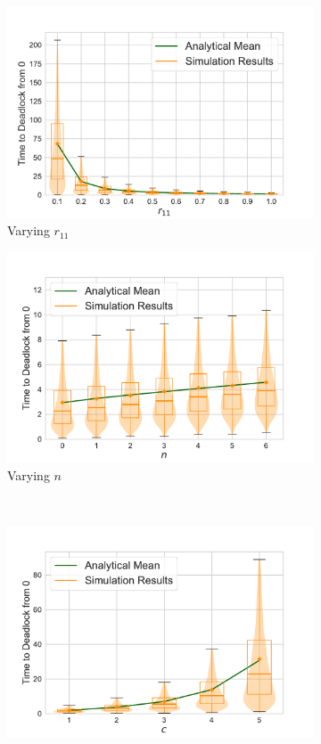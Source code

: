 \documentclass{article}
\numberwithin{equation}{section}
\begin{document}
\begin{figure}[!htbp]
\begin{center}
\begin{subfigure}[b]{0.48\textwidth}
    \includegraphics[width=\textwidth]{images/1Nms_varyr11}
    \caption{Varying $r_{11}$}
    \label{fig:1Nms_r11}
  \end{subfigure}
  \begin{subfigure}[b]{0.48\textwidth}
    \includegraphics[width=\textwidth]{images/1Nms_varyn}
    \caption{Varying $n$}
    \label{fig:1Nms_n}
  \end{subfigure}\\
  \begin{subfigure}[b]{0.48\textwidth}
    \includegraphics[width=\textwidth]{images/1Nms_varyc}

\end{subfigure}
\end{center}
\end{figure}
\end{document}
